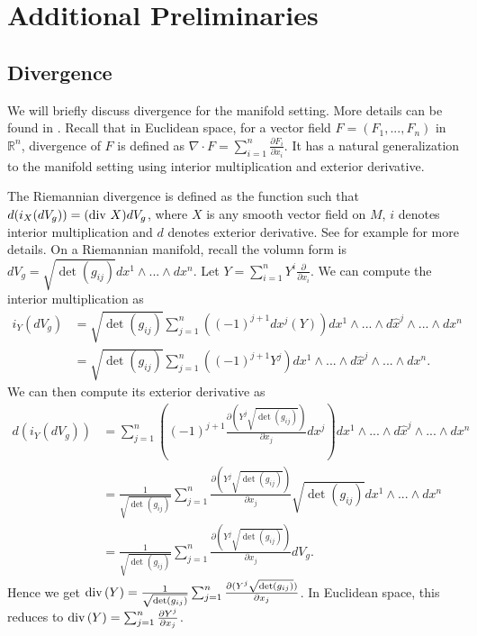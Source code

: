 \section{Additional Preliminaries}\label{sec:addprelim}

\subsection{Divergence}

We will briefly discuss divergence for the manifold setting. 
More details can be found in \cite{lee2018introduction}.
Recall that in Euclidean space, for a vector field $F = (F_{1}, ..., F_{n})$ in $\mathbb{R}^{n}$, 
divergence of $F$ is defined as $\nabla \cdot F = \sum_{i = 1}^{n} \frac{\partial F_{i}}{\partial x_{i}}$. It has a natural generalization to the manifold setting using interior multiplication and exterior derivative. 

The Riemannian divergence is defined as the function such that $d(i_{X} (dV_{g})) = (\operatorname{div\,} X)dV_{g}$, 
where $X$ is any smooth vector field on $M$, $i$ denotes interior multiplication and $d$ denotes exterior derivative. See for example \citet[Appendix B]{lee2018introduction} for more details. 
On a Riemannian manifold, recall the volumn form is 
$dV_{g} = \sqrt{\det(g_{ij})} dx^{1} \wedge ... \wedge dx^{n} $.
Let $Y = \sum_{i = 1}^{n} Y^{i} \frac{\partial}{\partial x_{i}}$. We can compute the interior multiplication as
\begin{align*}
        i_{Y} (dV_{g}) &= \sqrt{\det(g_{ij})}\sum_{j = 1}^{n} ((-1)^{j+1} dx^{j}(Y)) 
        dx^{1} \wedge ... \wedge d\hat{x}^{j} \wedge ... \wedge dx^{n} \\
        &= \sqrt{\det(g_{ij})}\sum_{j = 1}^{n} ((-1)^{j+1} Y^{j}) 
        dx^{1} \wedge ... \wedge d\hat{x}^{j} \wedge ... \wedge dx^{n}.
\end{align*}
We can then compute its exterior derivative as
\begin{align*}
        d(i_{Y} (dV_{g})) 
        &= \sum_{j = 1}^{n} ((-1)^{j+1} \frac{\partial (Y^{j} \sqrt{\det(g_{ij})})}{\partial x_{j}} dx^{j}) 
    dx^{1} \wedge ... \wedge d\hat{x}^{j} \wedge ... \wedge dx^{n} \\
    &= \frac{1}{\sqrt{\det(g_{ij})}}\sum_{j = 1}^{n} \frac{\partial (Y^{j} \sqrt{\det(g_{ij})})}{\partial x_{j}} 
    \sqrt{\det(g_{ij})} dx^{1} \wedge ... \wedge dx^{n} \\
    &= \frac{1}{\sqrt{\det(g_{ij})}}\sum_{j = 1}^{n} \frac{\partial (Y^{j} \sqrt{\det(g_{ij})})}{\partial x_{j}} dV_{g}.
\end{align*}
Hence we get $\operatorname{div\,}(Y) = \frac{1}{\sqrt{\det(g_{ij})}}\sum_{j = 1}^{n} \frac{\partial (Y^{j} \sqrt{\det(g_{ij})})}{\partial x_{j}}$.
In Euclidean space, this reduces to $\operatorname{div\,}(Y) = \sum_{j = 1}^{n} \frac{\partial Y^{j}}{\partial x_{j}}$.

